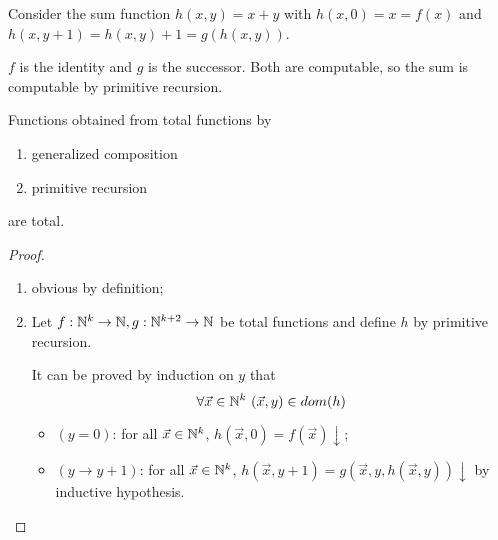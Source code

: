\begin{example}
  Consider the sum function $ h(x,y) = x+y $ with $ h(x,0) = x = f(x) $ and $ h(x,y+1) = h(x,y) + 1 = g(h(x,y)) $.
  
  $f$ is the identity and $g$ is the successor.
   Both are computable, so the sum is computable by primitive recursion.
\end{example}



\begin{proposition}
  Functions obtained from total functions by
\begin{enumerate}
\item generalized composition
\item primitive recursion
\end{enumerate}
are total.
\begin{proof}
  \begin{enumerate}
    \item obvious by definition;
    \item Let $f:\mathbb{N}^k\rightarrow\mathbb{N}, g:\mathbb{N}^{k+2}\rightarrow\mathbb{N}$ be total functions and define
    $h$ by primitive recursion.
    
    It can be proved by induction on $y$ that 
    \begin{equation*}
      \forall \vec{x}\in\nat^k  \ (\vec{x},y) \in dom(h)
    \end{equation*}
    \begin{itemize}
      \item $(y=0)$: for all $\vec{x}\in\mathbb{N}^k$, $h(\vec{x},0) = f(\vec{x})\downarrow$;
      \item $(y\rightarrow y+1)$: for all $\vec{x}\in\mathbb{N}^k$, $h(\vec{x},y+1) = g(\vec{x},y,h(\vec{x},y))\downarrow$ by inductive hypothesis.
    \end{itemize}
  \end{enumerate}
\end{proof}
\end{proposition}





